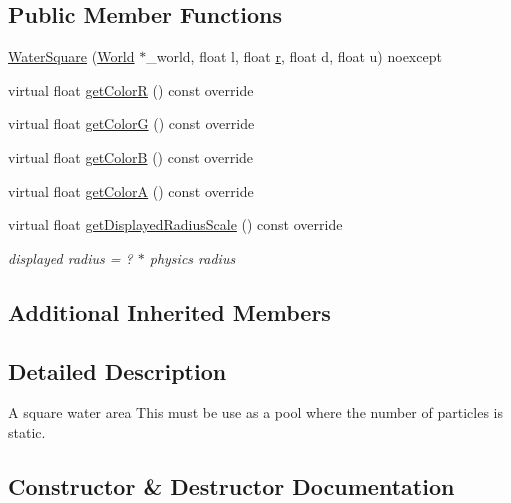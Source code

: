 \subsection*{Public Member Functions}
\begin{DoxyCompactItemize}
\item 
\hyperlink{classWaterSquare_ab34c28194e6b09837e2bcd7cafef314e}{Water\+Square} (\hyperlink{classWorld}{World} $\ast$\+\_\+world, float l, float \hyperlink{image_8h_a62969232668331297e2dca1ae2ddd10d}{r}, float d, float u) noexcept
\item 
virtual float \hyperlink{classWaterSquare_ae34b29db832bbe03ce6521493a17fac3}{get\+Color\+R} () const override
\item 
virtual float \hyperlink{classWaterSquare_ae63df10dd32846cca279aef4f86da099}{get\+Color\+G} () const override
\item 
virtual float \hyperlink{classWaterSquare_a6dd404113fa8377a06d4dd62fd711578}{get\+Color\+B} () const override
\item 
virtual float \hyperlink{classWaterSquare_a7f549f3b3c9b7a350aa2ae62c4db7ce5}{get\+Color\+A} () const override
\item 
virtual float \hyperlink{classWaterSquare_aefb21ab0a4f52f3fbd998d2c7e4feed4}{get\+Displayed\+Radius\+Scale} () const override
\begin{DoxyCompactList}\small\item\em displayed radius = ? $\ast$ physics radius \end{DoxyCompactList}\end{DoxyCompactItemize}
\subsection*{Additional Inherited Members}


\subsection{Detailed Description}
A square water area This must be use as a pool where the number of particles is static. 

\subsection{Constructor \& Destructor Documentation}
\hypertarget{classWaterSquare_ab34c28194e6b09837e2bcd7cafef314e}{}
